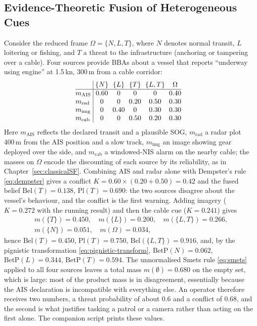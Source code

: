\subsection{Evidence-Theoretic Fusion of Heterogeneous Cues}
\label{subsec:maritime-evidence}
\begin{example}
\label{ex:ch07-maritime-evidence}
Consider the reduced frame $\Omega=\{N,L,T\}$, where $N$ denotes normal transit, $L$ loitering or fishing, and $T$ a threat to the infrastructure (anchoring or tampering over a cable). Four sources provide BBAs about a vessel that reports ``underway using engine'' at 1.5\,kn, 300\,m from a cable corridor:
\begin{equation}
\setlength{\arraycolsep}{3pt}
\begin{array}{@{}l|ccccc@{}}
 & \{N\} & \{L\} & \{T\} & \{L,T\} & \Omega \\
\hline
m_{\mathrm{AIS}} & 0.60 & 0 & 0 & 0 & 0.40 \\
m_{\mathrm{rad}} & 0 & 0 & 0.20 & 0.50 & 0.30 \\
m_{\mathrm{img}} & 0 & 0.40 & 0 & 0.30 & 0.30 \\
m_{\mathrm{cab}} & 0 & 0 & 0.50 & 0.20 & 0.30
\end{array}
\label{eq:ch07-maritime-bbas}
\end{equation}
Here $m_{\mathrm{AIS}}$ reflects the declared transit and a plausible SOG, $m_{\mathrm{rad}}$ a radar plot 400\,m from the AIS position and a slow track, $m_{\mathrm{img}}$ an image showing gear deployed over the side, and $m_{\mathrm{cab}}$ a windowed-NIS alarm on the nearby cable; the masses on $\Omega$ encode the discounting of each source by its reliability, as in Chapter~\ref{sec:classicalSF}. Combining AIS and radar alone with Dempster's rule \eqref{eq:dempster} gives a conflict $K=0.60\times(0.20+0.50)=0.42$ and the fused belief $\mathrm{Bel}(T)=0.138$, $\mathrm{Pl}(T)=0.690$: the two sources disagree about the vessel's behaviour, and the conflict is the first warning. Adding imagery ($K=0.272$ with the running result) and then the cable cue ($K=0.241$) gives
\begin{equation}
\begin{aligned}
&m(\{T\})=0.450,\quad m(\{L\})=0.200,\quad m(\{L,T\})=0.266,\\
&m(\{N\})=0.051,\quad m(\Omega)=0.034,
\end{aligned}
\end{equation}
hence $\mathrm{Bel}(T)=0.450$, $\mathrm{Pl}(T)=0.750$, $\mathrm{Bel}(\{L,T\})=0.916$, and, by the pignistic transformation \eqref{eq:pignistic-transform}, $\mathrm{BetP}(N)=0.062$, $\mathrm{BetP}(L)=0.344$, $\mathrm{BetP}(T)=0.594$. The unnormalised Smets rule \eqref{eq:smets} applied to all four sources leaves a total mass $m(\emptyset)=0.680$ on the empty set, which is large: most of the product mass is in disagreement, essentially because the AIS declaration is incompatible with everything else. An operator therefore receives two numbers, a threat probability of about $0.6$ and a conflict of $0.68$, and the second is what justifies tasking a patrol or a camera rather than acting on the first alone. The companion script  prints these values.
\end{example}


